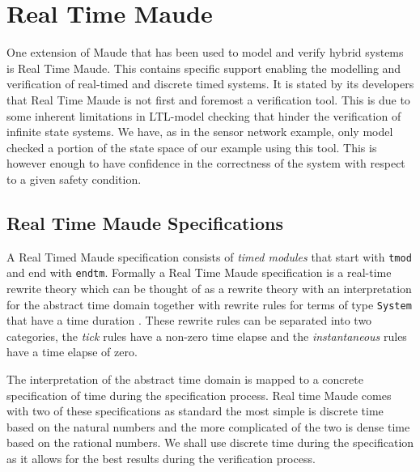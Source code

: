 \section{Real Time Maude}
One extension of Maude that has been used to model and verify hybrid systems is Real Time Maude. This contains specific support enabling the modelling and verification of real-timed and discrete timed systems. It is stated by its developers that Real Time Maude is not first and foremost a verification tool. This is due to some inherent limitations in LTL-model checking that hinder the verification of infinite state systems. We have, as in the sensor network example, only model checked a portion of the state space of our example using this tool. This is however enough to have confidence in the correctness of the system with respect to a given safety condition.


\subsection{Real Time Maude Specifications}
A Real Timed Maude specification consists of \emph{timed modules} that start with \texttt{tmod} and end with \texttt{endtm}. Formally a Real Time Maude specification is a real-time rewrite theory which can be thought of as a rewrite theory with an interpretation for the abstract time domain together with rewrite rules for terms of type \texttt{System} that have a time duration \cite{PO02}. These rewrite rules can be separated into two categories, the \emph{tick} rules have a non-zero time elapse and the \emph{instantaneous} rules have a time elapse of zero.

The interpretation of the abstract time domain is mapped to a concrete specification of time during the specification process. Real time Maude comes with two of these specifications as standard the most simple  is discrete time based on the natural numbers and the more complicated of the two is dense time based on the rational numbers. We shall use discrete time during the specification as it allows for the best results during the verification process. 

\medskip

